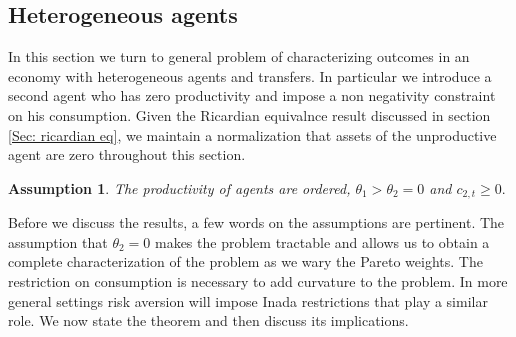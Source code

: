 \documentclass[11.5pt,twoside]{article}
\newtheorem{assumption}{Assumption}
\begin{document}
\subsection{Heterogeneous agents}
\label{Sec: het agent}
In this section we turn to general problem of characterizing outcomes in an economy with heterogeneous agents and  transfers. In particular we introduce a second agent who has zero productivity and impose a non negativity constraint on his consumption. Given the Ricardian equivalnce result discussed in section \ref{Sec: ricardian eq}, we maintain a normalization that assets of the unproductive agent are zero throughout this section.
\begin{assumption}
The productivity of agents are ordered, $\theta_1>\theta_2=0$  and $c_{2,t}\geq 0.$
\end{assumption}
Before we discuss the results, a few words on the assumptions are pertinent. The assumption that $\theta_2=0$ makes the problem tractable and allows us to obtain a complete characterization of the problem as we wary the Pareto weights. The restriction on consumption is necessary to add  curvature to the problem. In more general settings risk aversion will impose Inada restrictions that play a similar role. We now state the theorem and then discuss its implications.
\end{document}

